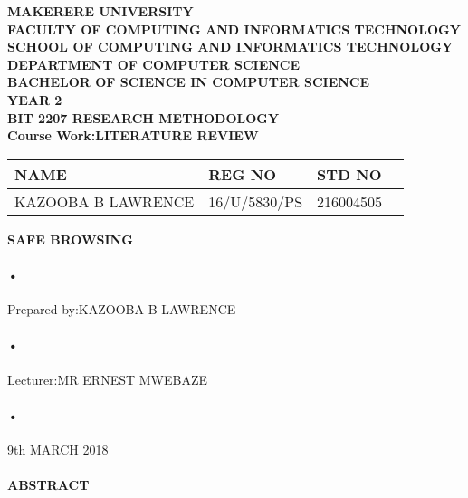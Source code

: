 \documentclass[12pt]{article}
\begin{document}
\begin{Huge}
\begin{center}
\begin{normalsize}
\textbf{MAKERERE  UNIVERSITY }\\


\textbf{FACULTY OF COMPUTING AND INFORMATICS TECHNOLOGY} \\
\textbf{SCHOOL OF COMPUTING AND INFORMATICS TECHNOLOGY} \\
\textbf{DEPARTMENT OF COMPUTER SCIENCE} \\
\textbf{BACHELOR OF SCIENCE IN COMPUTER SCIENCE} \\
\textbf{YEAR 2} \\
\textbf{BIT 2207 RESEARCH METHODOLOGY} \\
\textbf{Course Work:LITERATURE REVIEW}\\
\end{normalsize}
\end{center}
\end{Huge}

\begin{center}
\begin{tabular}{|l|l|l|c|}
\hline NAME  & REG NO & STD NO \\\hline
KAZOOBA B LAWRENCE& 16/U/5830/PS & 216004505 \\\hline
\end{tabular}

\end{center}

\begin{center}
\textbf{SAFE BROWSING}\\
\paragraph{•}
Prepared by:KAZOOBA B LAWRENCE \\
\paragraph{•}
Lecturer:MR ERNEST MWEBAZE \\
\paragraph{•}
9th MARCH 2018

\end{center}

\paragraph{ABSTRACT}
\end{document}
